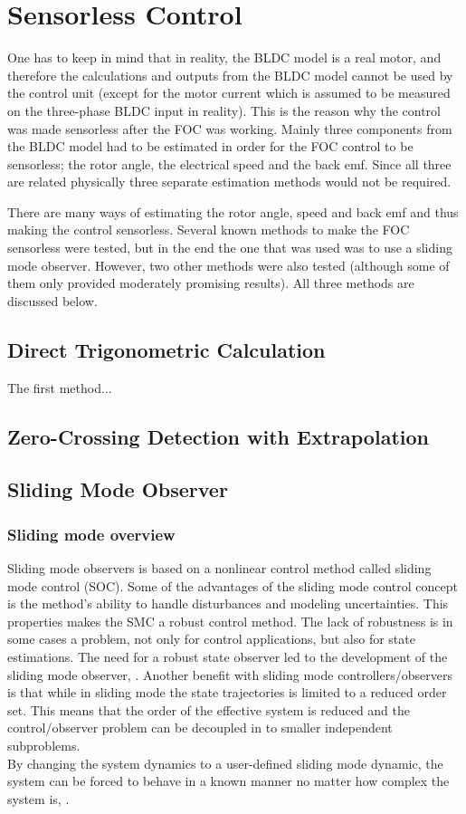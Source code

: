 \documentclass{LTHthesis}
\begin{document}
\chapter{Sensorless Control}
One has to keep in mind that in reality, the BLDC model is a real motor, and therefore the calculations and outputs from the BLDC model cannot be used by the control unit (except for the motor current which is assumed to be measured on the three-phase BLDC input in reality). This is the reason why the control was made sensorless after the FOC was working. Mainly three components from the BLDC model had to be estimated in order for the FOC control to be sensorless; the rotor angle, the electrical speed and the back emf. Since all three are related physically three separate estimation methods would not be required.

There are many ways of estimating the rotor angle, speed and back emf and thus making the control sensorless. Several known methods to make the FOC sensorless were tested, but in the end the one that was used was to use a sliding mode observer. However, two other methods were also tested (although some of them only provided moderately promising results). All three methods are discussed below.

\section{Direct Trigonometric Calculation}
The first method...

\section{Zero-Crossing Detection with Extrapolation}

\section{Sliding Mode Observer}
\subsection{Sliding mode overview}
 
Sliding mode observers is based on a nonlinear control method called sliding mode control (SOC). Some of the advantages of the sliding mode control concept is the method's ability to handle disturbances and modeling uncertainties. This properties makes the SMC a robust control method. The lack of robustness is in some cases a problem, not only for control applications, but also for state estimations. The need for a robust state observer led to the development of the sliding mode observer, \cite{vel_kim_lee2011}.
Another benefit with sliding mode controllers/observers is that while in sliding mode the state trajectories is limited to a reduced order set. This means that the order of the effective system is reduced and the control/observer problem can be decoupled in to smaller independent subproblems.\\ By changing the system dynamics to a user-defined sliding mode dynamic, the system can be forced to behave in a known manner no matter how complex the system is, \cite{Has1996}. 
\end{document}
